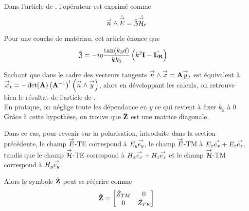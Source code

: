 
        Dans l'article de \cite{marceaux_high-order_2000}, l'opérateur est exprimé comme
        \begin{equation}
            {\overset{\rightarrow}{n}} \wedge \hat{{\overset{\rightarrow}{E}}} = \hat{\mathfrak{Z}} \hat{{\overset{\rightarrow}{\mathcal{H}}}_t}
        \end{equation}

        Pour une couche de matériau, cet article énonce que 
        \begin{align}
            \hat{\mathfrak{Z}} &= -i\eta\dfrac{\tan(k_3d)}{kk_3}\left(k^2\mathbf{I} - \hat{\mathbf{L_R}}\right)
        \end{align}

        Sachant que dans le cadre des vecteurs tangents \({\overset{\rightarrow}{n}}\wedge {\overset{\rightarrow}{x}} = \mathbf{A} {\overset{\rightarrow}{y}}_t\) est équivalent à \({\overset{\rightarrow}{x}}_t = -\det(\mathbf{A})\left(\mathbf{A}^{-1}\right)^t\left({\overset{\rightarrow}{n}}\wedge{\overset{\rightarrow}{y}}\right)\), alors en développant les calculs, on retrouve bien le résultat de l'article de \cite{marceaux_high-order_2000}.\\

        En pratique, on néglige toute les dépendance en \(y\) ce qui revient à fixer \(k_y\) à \(0\). Grâce à cette hypothèse, on trouve que \(\hat {\mathbf{Z}}\) est une matrice diagonale.

        Dans ce cas, pour revenir sur la polarisation, introduite dans la section précédente, le champ \({\overset{\rightarrow}{E}}\)-TE correspond à \({E_y} {\overset{\rightarrow}{e_y}}\), le champ \({\overset{\rightarrow}{E}}\)-TM à \({E_x} {\overset{\rightarrow}{e_x}} + {E_z} {\overset{\rightarrow}{e_z}} \), tandis que le champ \({\overset{\rightarrow}{\mathcal{H}}}\)-TE correspond à \({H_x} {\overset{\rightarrow}{e_x}} + {H_z} {\overset{\rightarrow}{e_z}}\) et le champ \({\overset{\rightarrow}{\mathcal{H}}}\)-TM correspond à \({H_y} {\overset{\rightarrow}{e_y}}\).
        
        Alors le symbole \(\hat {\mathbf{Z}}\) peut se réécrire comme
        \begin{equation}
            \hat {\mathbf{Z}} =
            \begin{bmatrix}
                \hat Z_{TM} & 0
                \\
                0 & \hat Z_{TE}
            \end{bmatrix}
        \end{equation}


